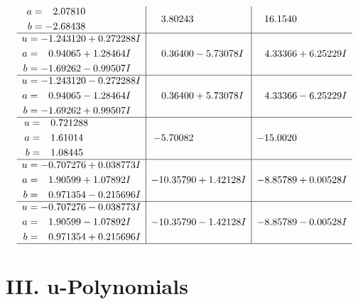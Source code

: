 \documentclass[1p]{elsarticle_modified}
\theoremstyle{definition}
\begin{document}
$$\begin{array}{c|c|c}
\begin{aligned}
a &= \phantom{-}2.07810\phantom{ +0.000000I} \\
b &= -2.68438\phantom{ +0.000000I}\end{aligned}
 & \phantom{-}3.80243\phantom{ +0.000000I} & \phantom{-}16.1540\phantom{ +0.000000I} \\ \hline\begin{aligned}
u &= -1.243120 + 0.272288 I \\
a &= \phantom{-}0.94065 + 1.28464 I \\
b &= -1.69262 - 0.99507 I\end{aligned}
 & \phantom{-}0.36400 - 5.73078 I & \phantom{-}4.33366 + 6.25229 I \\ \hline\begin{aligned}
u &= -1.243120 - 0.272288 I \\
a &= \phantom{-}0.94065 - 1.28464 I \\
b &= -1.69262 + 0.99507 I\end{aligned}
 & \phantom{-}0.36400 + 5.73078 I & \phantom{-}4.33366 - 6.25229 I \\ \hline\begin{aligned}
u &= \phantom{-}0.721288\phantom{ +0.000000I} \\
a &= \phantom{-}1.61014\phantom{ +0.000000I} \\
b &= \phantom{-}1.08445\phantom{ +0.000000I}\end{aligned}
 & -5.70082\phantom{ +0.000000I} & -15.0020\phantom{ +0.000000I} \\ \hline\begin{aligned}
u &= -0.707276 + 0.038773 I \\
a &= \phantom{-}1.90599 + 1.07892 I \\
b &= \phantom{-}0.971354 - 0.215696 I\end{aligned}
 & -10.35790 + 1.42128 I & -8.85789 + 0.00528 I \\ \hline\begin{aligned}
u &= -0.707276 - 0.038773 I \\
a &= \phantom{-}1.90599 - 1.07892 I \\
b &= \phantom{-}0.971354 + 0.215696 I\end{aligned}
 & -10.35790 - 1.42128 I & -8.85789 - 0.00528 I\\
 \hline 
 \end{array}$$\newpage
\newpage\renewcommand{\arraystretch}{1}
\centering \section*{ III. u-Polynomials}
\end{document}
